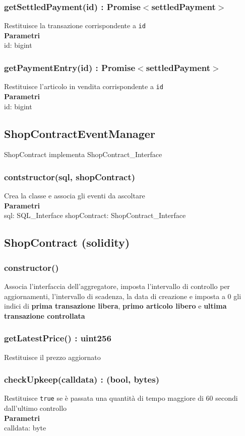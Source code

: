 \documentclass[a4paper, 12pt]{article}
\begin{document}
\subsubsection{getSettledPayment(id) : Promise$<$settledPayment$>$}
Restituisce la transazione corrispondente a \texttt{id}\\
\textbf{Parametri}\\
id: bigint
\subsubsection{getPaymentEntry(id) : Promise$<$settledPayment$>$}
Restituisce l'articolo in vendita corrispondente a \texttt{id}\\
\textbf{Parametri}\\
id: bigint

\subsection{ShopContractEventManager}
ShopContract implementa ShopContract\_Interface
\subsubsection{contstructor(sql, shopContract)}
Crea la classe e associa gli eventi da ascoltare\\
\textbf{Parametri}\\
sql: SQL\_Interface
shopContract: ShopContract\_Interface
 
\subsection{ShopContract (solidity)}
\subsubsection{constructor()}
Associa l'interfaccia dell'aggregatore, imposta l'intervallo di controllo per aggiornamenti, l'intervallo di scadenza, la data di creazione e imposta a 0 gli indici di \textbf{prima transazione libera}, \textbf{primo articolo libero} e \textbf{ultima transazione controllata}\\
\subsubsection{getLatestPrice() : uint256}
Restituisce il prezzo aggiornato\\
\subsubsection{checkUpkeep(calldata) : (bool, bytes)}
Restituisce \texttt{true} se è passata una quantità di tempo maggiore di 60 secondi dall'ultimo controllo\\
\textbf{Parametri}\\
calldata: byte
\end{document}

